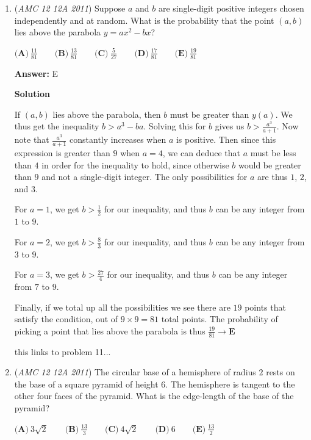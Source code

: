 \begin{enumerate}
 -srisainandan6

 


	\item (\textit{AMC 12 12A 2011}) Suppose $a$ and $b$ are single-digit positive integers chosen independently and at random. What is the probability that the point $(a,b)$ lies above the parabola $y=ax^2-bx$?


 $\textbf{(A)}\ \frac{11}{81} \qquad \textbf{(B)}\ \frac{13}{81} \qquad \textbf{(C)}\ \frac{5}{27} \qquad \textbf{(D)}\ \frac{17}{81} \qquad \textbf{(E)}\ \frac{19}{81}$

 \textbf{Answer: }E



\textbf{Solution}

If $(a,b)$ lies above the parabola, then $b$ must be greater than $y(a)$. We thus get the inequality $b>a^3-ba$. Solving this for $b$ gives us $b>\frac{a^3}{a+1}$. Now note that $\frac{a^3}{a+1}$ constantly increases when $a$ is positive. Then since this expression is greater than $9$ when $a=4$, we can deduce that $a$ must be less than $4$ in order for the inequality to hold, since otherwise $b$ would be greater than $9$ and not a single-digit integer. The only possibilities for $a$ are thus $1$, $2$, and $3$.

 For $a=1$, we get $b>\frac{1}{2}$ for our inequality, and thus $b$ can be any integer from $1$ to $9$.

 For $a=2$, we get $b>\frac{8}{3}$ for our inequality, and thus $b$ can be any integer from $3$ to $9$.

 For $a=3$, we get $b>\frac{27}{4}$ for our inequality, and thus $b$ can be any integer from $7$ to $9$.

 Finally, if we total up all the possibilities we see there are $19$ points that satisfy the condition, out of $9 \times 9 = 81$ total points. The probability of picking a point that lies above the parabola is thus $\frac{19}{81} \rightarrow \boxed{\textbf{E}}$

 this links to problem 11...

 


	\item (\textit{AMC 12 12A 2011}) The circular base of a hemisphere of radius $2$ rests on the base of a square pyramid of height $6$. The hemisphere is tangent to the other four faces of the pyramid. What is the edge-length of the base of the pyramid?


 $\textbf{(A)}\ 3\sqrt{2} \qquad \textbf{(B)}\ \frac{13}{3} \qquad \textbf{(C)}\ 4\sqrt{2} \qquad \textbf{(D)}\ 6 \qquad \textbf{(E)}\ \frac{13}{2}$


\end{enumerate}
